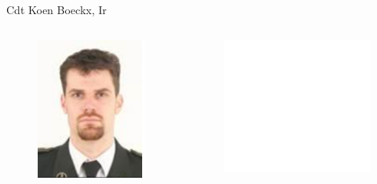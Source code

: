 \documentclass{beamer}
\begin{document}
\begin{frame}{Cdt Koen Boeckx, Ir}
\begin{columns}
\begin{figure}[htp]
    \centering
    \includegraphics[width=\textwidth]{images/foto.png}
\end{figure}
\begin{figure}[htp]
  \centering
  \includegraphics[scale=0.5]{images/iteration/screenshot07.png}
\end{figure}
\end{columns}

\end{frame}
\end{document}
